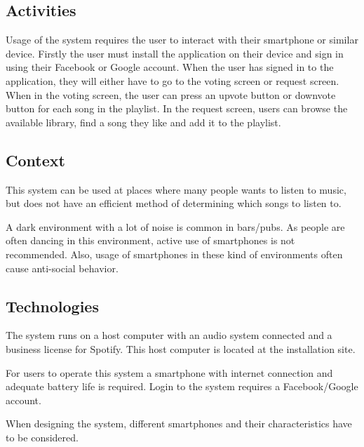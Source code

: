 \subsection{Activities}
\label{sub:pact_activities}

Usage of the system requires the user to interact with their smartphone or similar device. Firstly the user must install the application on their device and sign in using their Facebook or Google account. When the user has signed in to the application, they will either have to go to the voting screen or request screen. When in the voting screen, the user can press an upvote button or downvote button for each song in the playlist. In the request screen, users can browse the available library, find a song they like and add it to the playlist.

\subsection{Context}
\label{sub:pact_context}

This system can be used at places where many people wants to listen to music, but does not have an efficient method of determining which songs to listen to.

A dark environment with a lot of noise is common in bars/pubs. As people are often dancing in this environment, active use of smartphones is not recommended. Also, usage of smartphones in these kind of environments often cause anti-social behavior.

\subsection{Technologies}
\label{sub:pact_technologies}

The system runs on a host computer with an audio system connected and a business license for Spotify. This host computer is located at the installation site. 

For users to operate this system a smartphone with internet connection and adequate battery life is required. Login to the system requires a Facebook/Google account.

When designing the system, different smartphones and their characteristics have to be considered.
